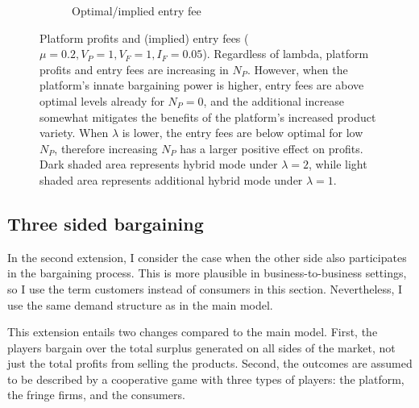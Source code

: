 \begin{figure}
\begin{subfigure}[b]{0.45\textwidth}
        \caption{Optimal/implied entry fee}
        \label{fig:entry_fee_high_lambda}
    \end{subfigure}
    \caption{Platform profits and (implied) entry fees ($\mu = 0.2, V_P = 1, V_F = 1, I_F = 0.05$). Regardless of lambda, platform profits and entry fees are increasing in $N_P$. However, when the platform's innate bargaining power is higher, entry fees are above optimal levels already for $N_P = 0$, and the additional increase somewhat mitigates the benefits of the platform's increased product variety. When $\lambda$ is lower, the entry fees are below optimal for low $N_P$, therefore increasing $N_P$ has a larger positive effect on profits. Dark shaded area represents hybrid mode under $\lambda=2$, while light shaded area represents additional hybrid mode under $\lambda=1$.}
    \label{fig:profits_and_entry_fees_high_lambda}
\end{figure}


\subsection{Three sided bargaining}
\label{sec:two_sided}

In the second extension, I consider the case when the other side also participates in the bargaining process.
This is more plausible in business-to-business settings, so I use the term customers instead of consumers in this section.
Nevertheless, I use the same demand structure as in the main model.

This extension entails two changes compared to the main model.
First, the players bargain over the total surplus generated on all sides of the market, not just the total profits from selling the products.
Second, the outcomes are assumed to be described by a cooperative game with three types of players: the platform, the fringe firms, and the consumers.

